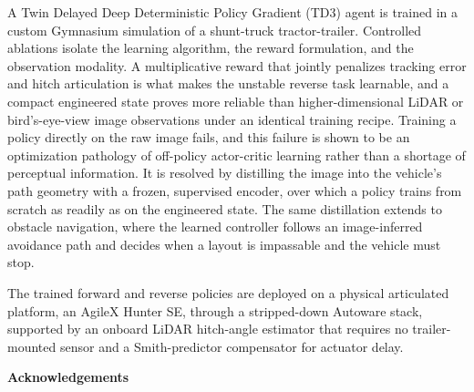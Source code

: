 \documentclass[12pt]{report}
\begin{document}
A Twin Delayed Deep Deterministic Policy Gradient (TD3) agent is trained in a custom Gymnasium simulation of a shunt-truck tractor-trailer. Controlled ablations isolate the learning algorithm, the reward formulation, and the observation modality. A multiplicative reward that jointly penalizes tracking error and hitch articulation is what makes the unstable reverse task learnable, and a compact engineered state proves more reliable than higher-dimensional LiDAR or bird's-eye-view image observations under an identical training recipe. Training a policy directly on the raw image fails, and this failure is shown to be an optimization pathology of off-policy actor-critic learning rather than a shortage of perceptual information. It is resolved by distilling the image into the vehicle's path geometry with a frozen, supervised encoder, over which a policy trains from scratch as readily as on the engineered state. The same distillation extends to obstacle navigation, where the learned controller follows an image-inferred avoidance path and decides when a layout is impassable and the vehicle must stop.

The trained forward and reverse policies are deployed on a physical articulated platform, an AgileX Hunter SE, through a stripped-down Autoware stack, supported by an onboard LiDAR hitch-angle estimator that requires no trailer-mounted sensor and a Smith-predictor compensator for actuator delay.
\clearpage

\begin{center}\textbf{Acknowledgements}\end{center}
\vspace{1em}

\clearpage

\tableofcontents

\listoffigures

\listoftables
\end{document}

